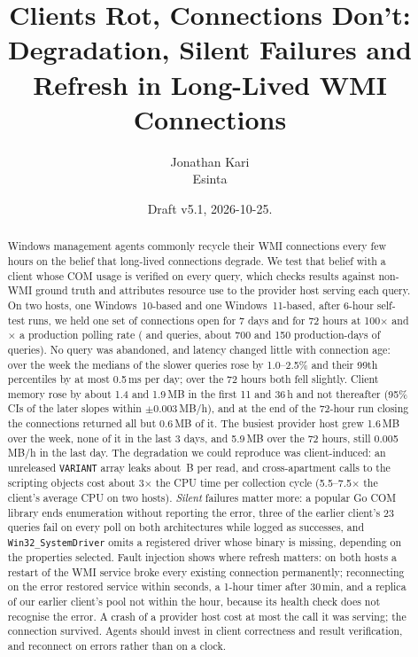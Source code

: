 \documentclass[letterpaper,twocolumn,10pt]{article}
\title{\Large\bfseries Clients Rot, Connections Don't:\\ Degradation, Silent Failures and Refresh in Long-Lived WMI Connections}
\author{Jonathan Kari\\ \normalsize Esinta}
\date{\ifdraft\small Draft v5.1, 2026-10-25. \authornote{Red: author input}\fi}
\newcommand{\code}[1]{\texttt{\small #1}}
\begin{document}
\maketitle

\begin{abstract}
Windows management agents commonly recycle their WMI connections every few hours on the belief that long-lived connections degrade.
We test that belief with a client whose COM usage is verified on every query, which checks results against non-WMI ground truth and attributes resource use to the provider host serving each query.
On two hosts, one Windows~10-based and one Windows~11-based, after 6-hour self-test runs, we held one set of connections open for 7 days and for 72 hours at 100$\times$ and \WbK{}$\times$ a production polling rate (\HQueries{} and \LQueries{} queries, about 700 and 150 production-days of queries).
No query was abandoned, and latency changed little with connection age: over the week the medians of the slower queries rose by 1.0--2.5\% and their 99th percentiles by at most 0.5\,ms per day; over the 72 hours both fell slightly.
Client memory rose by about 1.4 and 1.9\,MB in the first 11 and 36\,h and not thereafter (95\% CIs of the later slopes within $\pm$0.003\,MB/h), and at the end of the 72-hour run closing the connections returned all but 0.6\,MB of it.
The busiest provider host grew 1.6\,MB over the week, none of it in the last 3 days, and 5.9\,MB over the 72 hours, still 0.005\,MB/h in the last day.
The degradation we could reproduce was client-induced: an unreleased \code{VARIANT} array leaks about \STtwoLeak{}\,B per read, and cross-apartment calls to the scripting objects cost about 3$\times$ the CPU time per collection cycle (5.5--7.5$\times$ the client's average CPU on two hosts).
\emph{Silent} failures matter more: a popular Go COM library ends enumeration without reporting the error, three of the earlier client's 23 queries fail on every poll on both architectures while logged as successes, and \code{Win32\_SystemDriver} omits a registered driver whose binary is missing, depending on the properties selected.
Fault injection shows where refresh matters: on both hosts a restart of the WMI service broke every existing connection permanently; reconnecting on the error restored service within seconds, a 1-hour timer after 30\,min, and a replica of our earlier client's pool not within the hour, because its health check does not recognise the error.
A crash of a provider host cost at most the call it was serving; the connection survived.
Agents should invest in client correctness and result verification, and reconnect on errors rather than on a clock.
\end{abstract}
\end{document}
